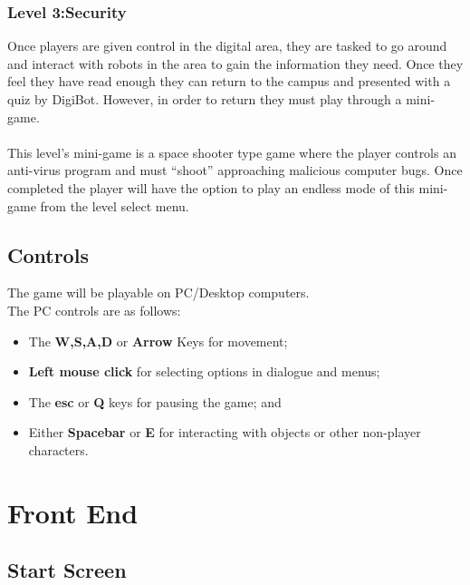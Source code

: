 \documentclass[a4paper]{scrreprt}
\begin{document}
\subsection{Level 3:Security}
Once players are given control in the digital area, they are tasked to go around and interact with robots in the area to gain the information they need. Once they feel they have read enough they can return to the campus and presented with a quiz by DigiBot. However, in order to return they must play through a mini-game. 
\\\\
This level's mini-game is a space shooter type game where the player controls an anti-virus program and must ``shoot'' approaching malicious computer bugs. Once completed the player will have the option to play an endless mode of this mini-game from the level select menu.

\section{Controls}
The game will be playable on PC/Desktop computers.
\\ 
The PC controls are as follows:
\begin{itemize}
\item The \textbf{W,S,A,D} or \textbf{Arrow} Keys for movement;
\item \textbf{Left mouse click} for selecting options in dialogue and menus; 
\item The \textbf{esc} or \textbf{Q} keys for pausing the game; and
\item Either \textbf{Spacebar} or \textbf{E} for interacting with objects or other non-player characters.
\end{itemize}


\chapter{Front End}


\section{Start Screen}
\end{document}
